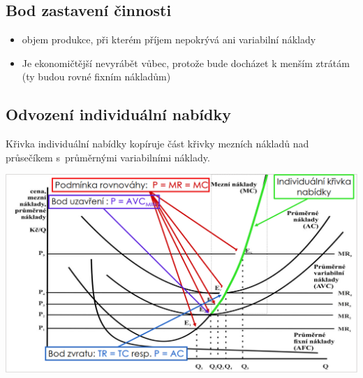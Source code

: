 \subsection{Bod zastavení činnosti}
\begin{itemize}
    \item objem produkce, při kterém příjem nepokrývá ani variabilní náklady
    \item Je ekonomičtější nevyrábět vůbec, protože bude docházet k menším ztrátám 
    (ty budou rovné fixním nákladům)
\end{itemize}

\subsection{Odvození individuální nabídky}
Křivka individuální nabídky kopíruje část křivky mezních nákladů nad průsečíkem 
s~průměrnými variabilními náklady.

\includegraphics[width=16cm]{images/09_indiv_nabidka.png}